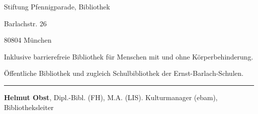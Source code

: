 Stiftung Pfennigparade, Bibliothek

Barlachstr. 26

80804 München

Inklusive barrierefreie Bibliothek für Menschen mit und ohne
Körperbehinderung.

Öffentliche Bibliothek und zugleich Schulbibliothek der
Ernst-Barlach-Schulen.

\begin{center}\rule{0.5\linewidth}{\linethickness}\end{center}

\textbf{Helmut Obst}, Dipl.-Bibl. (FH), M.A. (LIS). Kulturmanager
(ebam), Bibliotheksleiter
